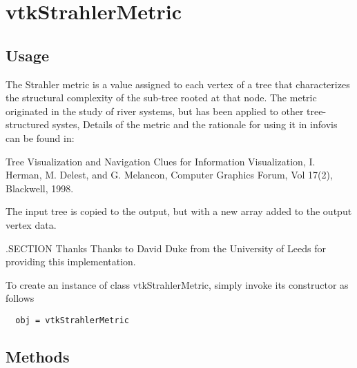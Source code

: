 \section{vtkStrahlerMetric}

\subsection{Usage}

 The Strahler metric is a value assigned to each vertex of a 
 tree that characterizes the structural complexity of the 
 sub-tree rooted at that node.  The metric originated in the
 study of river systems, but has been applied to other tree-
 structured systes,  Details of the metric and the rationale 
 for using it in infovis can be found in:
 
 Tree Visualization and Navigation Clues for Information
 Visualization, I. Herman, M. Delest, and G. Melancon,
 Computer Graphics Forum, Vol 17(2), Blackwell, 1998.

 The input tree is copied to the output, but with a new array
 added to the output vertex data.

 .SECTION Thanks
 Thanks to David Duke from the University of Leeds for providing this 
 implementation.

To create an instance of class vtkStrahlerMetric, simply
invoke its constructor as follows
\begin{verbatim}
  obj = vtkStrahlerMetric
\end{verbatim}
\subsection{Methods}

